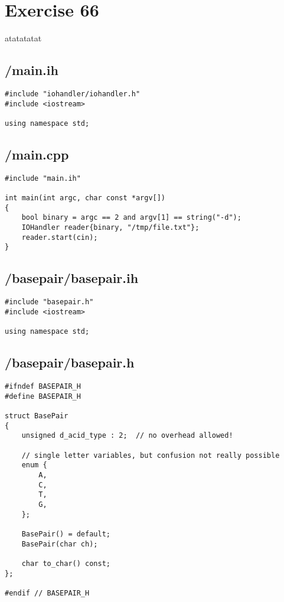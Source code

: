 \documentclass{article}
\begin{document}
\section*{Exercise 66}
atatatatat

\subsection*{/main.ih}
\begin{verbatim}
#include "iohandler/iohandler.h"
#include <iostream>

using namespace std;
\end{verbatim}
\subsection*{/main.cpp}
\begin{verbatim}
#include "main.ih"

int main(int argc, char const *argv[])
{
    bool binary = argc == 2 and argv[1] == string("-d");
    IOHandler reader{binary, "/tmp/file.txt"};
    reader.start(cin);
}

\end{verbatim}
\subsection*{/basepair/basepair.ih}
\begin{verbatim}
#include "basepair.h"
#include <iostream>

using namespace std;

\end{verbatim}
\subsection*{/basepair/basepair.h}
\begin{verbatim}
#ifndef BASEPAIR_H
#define BASEPAIR_H

struct BasePair 
{
    unsigned d_acid_type : 2;  // no overhead allowed!

    // single letter variables, but confusion not really possible
    enum {
        A,
        C, 
        T,
        G,
    };

    BasePair() = default;
    BasePair(char ch);

    char to_char() const;
};

#endif // BASEPAIR_H

\end{verbatim}
\end{document}
